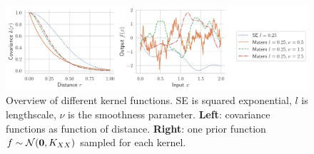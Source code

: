 \documentclass{article}
\begin{document}
\begin{figure}
    \centering
    \includegraphics[width=\textwidth]{res/covariance_overview.pdf}
    \caption{Overview of different kernel functions. SE is squared exponential, $l$ is lengthscale, $\nu$ is the smoothness parameter. \textbf{Left}: covariance functions as function of distance. \textbf{Right}: one prior function $f \sim \mathcal N(\boldsymbol{\mathbf{0}}, K_{XX})$ sampled for each kernel.}
    \label{fig:kernel_overview}
\end{figure}

\end{document}
